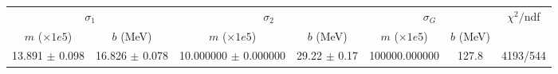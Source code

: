 \begin{tabular}{cc|cc|cc||c}
\multicolumn{2}{c|}{$\sigma_1$} & \multicolumn{2}{|c}{$\sigma_2$} & \multicolumn{2}{|c}{$\sigma_G$}  & \multirow{2}{*}{$\chi^2/$ndf}\\
$m$ ($\times1e5$) & $b$ (MeV) & $m$ ($\times1e5$) & $b$ (MeV) & $m$ ($\times1e5$) & $b$ (MeV) & \\
\hline
13.891 $\pm$ 0.098 & 16.826 $\pm$ 0.078 & 10.000000 $\pm$ 0.000000 & 29.22 $\pm$ 0.17 & 100000.000000 & 127.8 & 4193/544\\
\end{tabular}
